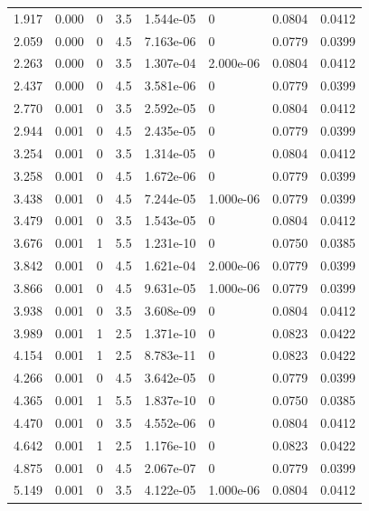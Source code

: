 \documentclass[preview]{standalone}
\begin{document}
{{\begin{tabular}{L{1.2cm}C{1.2cm} C{0.3cm}C{0.5cm} C{1.4cm}C{1.4cm} C{1.4cm}C{1.4cm}}
  1.917  &  0.000  & 0     & 3.5 &  1.544e-05  & 0  & 0.0804 &  0.0412   \\ 
  2.059  &  0.000  & 0     & 4.5 &  7.163e-06  & 0  & 0.0779 &  0.0399   \\ 
  2.263  &  0.000  & 0     & 3.5 &  1.307e-04  & 2.000e-06  & 0.0804 &  0.0412   \\ 
  2.437  &  0.000  & 0     & 4.5 &  3.581e-06  & 0  & 0.0779 &  0.0399   \\ 
  2.770  &  0.001  & 0     & 3.5 &  2.592e-05  & 0  & 0.0804 &  0.0412   \\ 
  2.944  &  0.001  & 0     & 4.5 &  2.435e-05  & 0  & 0.0779 &  0.0399   \\ 
  3.254  &  0.001  & 0     & 3.5 &  1.314e-05  & 0  & 0.0804 &  0.0412   \\ 
  3.258  &  0.001  & 0     & 4.5 &  1.672e-06  & 0  & 0.0779 &  0.0399   \\ 
  3.438  &  0.001  & 0     & 4.5 &  7.244e-05  & 1.000e-06  & 0.0779 &  0.0399   \\ 
  3.479  &  0.001  & 0     & 3.5 &  1.543e-05  & 0  & 0.0804 &  0.0412   \\ 
  3.676  &  0.001  & 1     & 5.5 &  1.231e-10  & 0  & 0.0750 &  0.0385   \\ 
  3.842  &  0.001  & 0     & 4.5 &  1.621e-04  & 2.000e-06  & 0.0779 &  0.0399   \\ 
  3.866  &  0.001  & 0     & 4.5 &  9.631e-05  & 1.000e-06  & 0.0779 &  0.0399   \\ 
  3.938  &  0.001  & 0     & 3.5 &  3.608e-09  & 0  & 0.0804 &  0.0412   \\ 
  3.989  &  0.001  & 1     & 2.5 &  1.371e-10  & 0  & 0.0823 &  0.0422   \\ 
  4.154  &  0.001  & 1     & 2.5 &  8.783e-11  & 0  & 0.0823 &  0.0422   \\ 
  4.266  &  0.001  & 0     & 4.5 &  3.642e-05  & 0  & 0.0779 &  0.0399   \\ 
  4.365  &  0.001  & 1     & 5.5 &  1.837e-10  & 0  & 0.0750 &  0.0385   \\ 
  4.470  &  0.001  & 0     & 3.5 &  4.552e-06  & 0  & 0.0804 &  0.0412   \\ 
  4.642  &  0.001  & 1     & 2.5 &  1.176e-10  & 0  & 0.0823 &  0.0422   \\ 
  4.875  &  0.001  & 0     & 4.5 &  2.067e-07  & 0  & 0.0779 &  0.0399   \\ 
  5.149  &  0.001  & 0     & 3.5 &  4.122e-05  & 1.000e-06  & 0.0804 &  0.0412   \\ 

\end{tabular}}}
\end{document}
